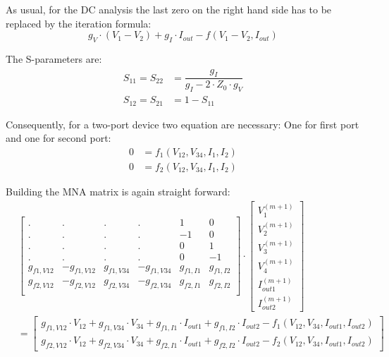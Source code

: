 As usual, for the DC analysis the last zero on the right hand side has
to be replaced by the iteration formula:
\begin{equation}
g_V\cdot (V_1 - V_2) + g_I\cdot I_{out} - f(V_1-V_2, I_{out})
\end{equation}

The S-parameters are:
\begin{align}
S_{11} = S_{22} &= \dfrac{g_I}{g_I - 2\cdot Z_0\cdot g_V}\\
S_{12} = S_{21} &= 1 - S_{11}
\end{align}

Consequently, for a two-port device two equation are necessary: One for
first port and one for second port:
\begin{align}
0 &= f_1(V_{12}, V_{34}, I_1, I_2)\\
0 &= f_2(V_{12}, V_{34}, I_1, I_2)
\end{align}

Building the MNA matrix is again straight forward:
\begin{equation}
\begin{split}
&\begin{bmatrix}
 . & . & . & . &  1 &  0\\
 . & . & . & . & -1 &  0\\
 . & . & . & . &  0 &  1\\
 . & . & . & . &  0 & -1\\
 g_{f1,V12} & -g_{f1,V12} &  g_{f1,V34} & -g_{f1,V34} & g_{f1,I1} & g_{f1,I2}\\
 g_{f2,V12} & -g_{f2,V12} &  g_{f2,V34} & -g_{f2,V34} & g_{f2,I1} & g_{f2,I2}\\
\end{bmatrix}
\cdot
\begin{bmatrix}
V_{1}^{(m+1)}\\
V_{2}^{(m+1)}\\
V_{3}^{(m+1)}\\
V_{4}^{(m+1)}\\
I_{out1}^{(m+1)}\\
I_{out2}^{(m+1)}
\end{bmatrix} \\
&=
\begin{bmatrix}
g_{f1,V12}\cdot V_{12} + g_{f1,V34}\cdot V_{34} + g_{f1,I1}\cdot I_{out1} + g_{f1,I2}\cdot I_{out2} - f_1(V_{12}, V_{34}, I_{out1}, I_{out2})\\
g_{f2,V12}\cdot V_{12} + g_{f2,V34}\cdot V_{34} + g_{f2,I1}\cdot I_{out1} + g_{f2,I2}\cdot I_{out2} - f_2(V_{12}, V_{34}, I_{out1}, I_{out2})
\end{bmatrix}
\end{split}
\end{equation}

